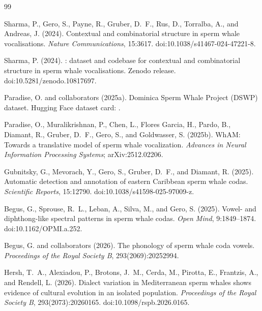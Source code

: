 \documentclass[11pt]{article}
\begin{document}
\begin{thebibliography}{99}

Sharma, P., Gero, S., Payne, R., Gruber, D.~F., Rus, D., Torralba, A., and Andreas, J. (2024).
\newblock Contextual and combinatorial structure in sperm whale vocalisations.
\newblock \emph{Nature Communications}, 15:3617. doi:10.1038/s41467-024-47221-8.

Sharma, P. (2024).
\newblock {}: dataset and codebase for contextual and combinatorial structure in sperm whale vocalisations.
\newblock Zenodo release. doi:10.5281/zenodo.10817697.

Paradise, O. and collaborators (2025a).
\newblock Dominica Sperm Whale Project (DSWP) dataset.
\newblock Hugging Face dataset card: .

Paradise, O., Muralikrishnan, P., Chen, L., Flores Garcia, H., Pardo, B., Diamant, R., Gruber, D.~F., Gero, S., and Goldwasser, S. (2025b).
\newblock WhAM: Towards a translative model of sperm whale vocalization.
\newblock \emph{Advances in Neural Information Processing Systems}; arXiv:2512.02206.

Gubnitsky, G., Mevorach, Y., Gero, S., Gruber, D.~F., and Diamant, R. (2025).
\newblock Automatic detection and annotation of eastern Caribbean sperm whale codas.
\newblock \emph{Scientific Reports}, 15:12790. doi:10.1038/s41598-025-97009-z.

Begus, G., Sprouse, R.~L., Leban, A., Silva, M., and Gero, S. (2025).
\newblock Vowel- and diphthong-like spectral patterns in sperm whale codas.
\newblock \emph{Open Mind}, 9:1849--1874. doi:10.1162/OPMI.a.252.

Begus, G. and collaborators (2026).
\newblock The phonology of sperm whale coda vowels.
\newblock \emph{Proceedings of the Royal Society B}, 293(2069):20252994.

Hersh, T.~A., Alexiadou, P., Brotons, J.~M., Cerda, M., Pirotta, E., Frantzis, A., and Rendell, L. (2026).
\newblock Dialect variation in Mediterranean sperm whales shows evidence of cultural evolution in an isolated population.
\newblock \emph{Proceedings of the Royal Society B}, 293(2073):20260165. doi:10.1098/rspb.2026.0165.


\end{thebibliography}
\end{document}
